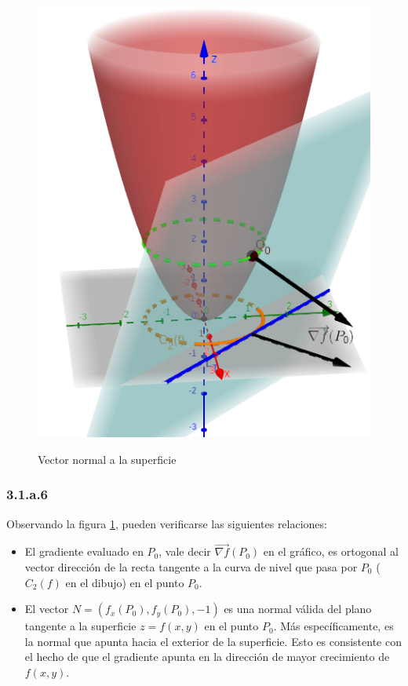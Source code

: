 \documentclass{article}
\begin{document}
\begin{figure}[ht]
\caption{Vector normal a la superficie}
\includegraphics[scale=0.35]{img/ejercicios/3/1-a-5.png} 
\centering
\label{fig:1-a-5}
\end{figure}

\subsubsection*{3.1.a.6}
\label{subsubsec:3.1.a.6}

Observando la figura \ref{fig:1-a-5}, pueden verificarse las siguientes relaciones:

\begin{itemize}
\item El gradiente evaluado en $P_0$, vale decir $\overrightarrow{ \nabla f}(P_0)$ en el gráfico, es ortogonal al vector dirección de la recta tangente a la curva de nivel que pasa por $P_0$ ($C_2(f)$ en el dibujo) en el punto $P_0$.
\item El vector $N = (f_x(P_0), f_y(P_0), -1)$ es una normal válida del plano tangente a la superficie $z = f(x,y)$ en el punto $P_0$. Más específicamente, es la normal que apunta hacia el exterior de la superficie. Esto es consistente con el hecho de que el gradiente apunta en la dirección de mayor crecimiento de $f(x,y)$.
\end{itemize}
\end{document}
